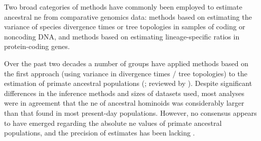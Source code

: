 Two broad categories of methods have commonly been employed to
estimate ancestral \ac{ne} from comparative genomics data: methods
based on estimating the variance of species divergence times or tree
topologies in samples of coding or noncoding DNA, and methods based on
estimating lineage-specific \dnds ratios in protein-coding genes.

Over the past two decades a number of groups have applied methods
based on the first approach (using variance in divergence times / tree
topologies) to the estimation of primate ancestral populations
(\citet{Takahata1997,Chen2001,Hobolth2007,Burgess2008}; reviewed by
\citet{Siepel2009a}). Despite significant differences in the inference
methods and sizes of datasets used, most analyses were in agreement
that the \ac{ne} of ancestral hominoids was considerably larger than
that found in most present-day populations. However, no consensus
appears to have emerged regarding the absolute \ac{ne} values of
primate ancestral populations, and the precision of estimates has been
lacking \citep{Siepel2009a}.

